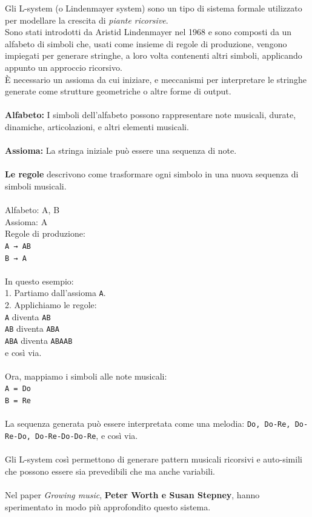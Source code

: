 \documentclass[a4paper,12pt]{report}
\begin{document}
Gli L-system (o Lindenmayer system) sono un tipo di sistema formale utilizzato per modellare la crescita di \textit{piante ricorsive}. \\
Sono stati introdotti da Aristid Lindenmayer nel 1968 e sono composti da un alfabeto di simboli che, usati come insieme di regole di produzione, vengono impiegati per generare stringhe, a loro volta contenenti altri simboli, applicando appunto un approccio ricorsivo. \\
È necessario un assioma da cui iniziare, e meccanismi per interpretare le stringhe generate come strutture geometriche o altre forme di output. \\
\\
\textbf{Alfabeto:} I simboli dell'alfabeto possono rappresentare note musicali, durate, dinamiche, articolazioni, e altri elementi musicali. \\
\\
\textbf{Assioma:} La stringa iniziale può essere una sequenza di note. \\
\\
\textbf{Le regole} descrivono come trasformare ogni simbolo in una nuova sequenza di simboli musicali. \\
\\
Alfabeto: {A, B} \\
Assioma: A \\
Regole di produzione: \\
  \texttt{A → AB} \\
  \texttt{B → A} \\
\\
In questo esempio: \\
1. Partiamo dall'assioma \texttt{A}. \\
2. Applichiamo le regole: \\
    \texttt{A} diventa \texttt{AB} \\
   \texttt{AB} diventa \texttt{ABA} \\
   \texttt{ABA} diventa \texttt{ABAAB} \\
   e così via. \\
\\
Ora, mappiamo i simboli alle note musicali: \\
\texttt{A = Do} \\
\texttt{B = Re} \\
\\
La sequenza generata può essere interpretata come una melodia: \texttt{Do, Do-Re, Do-Re-Do, Do-Re-Do-Do-Re}, e così via. \\
\\
Gli L-system così permettono di generare pattern musicali ricorsivi e auto-simili che possono essere sia prevedibili che ma anche variabili. \\
\\
Nel paper \textit{Growing music}, \textbf{Peter Worth e Susan Stepney}, hanno sperimentato in modo più approfondito questo sistema. \\
\end{document}
